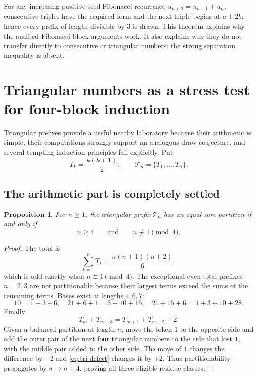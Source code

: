 \documentclass[11pt]{article}
\newtheorem{proposition}[theorem]{Proposition}
\theoremstyle{remark}
\begin{document}
For any increasing positive-seed Fibonacci recurrence
$u_{n+2}=u_{n+1}+u_n$, consecutive triples have the required form and the
next triple begins at $a+2b$; hence every prefix of length divisible by $3$
is drawn.  This theorem explains why the audited Fibonacci block arguments
work.  It also explains why they do not transfer directly to consecutive or
triangular numbers: the strong separation inequality is absent.

\section{Triangular numbers as a stress test for four-block induction}
Triangular prefixes provide a useful nearby laboratory because their
arithmetic is simple, their computations strongly support an analogous
draw conjecture, and several tempting induction principles fail explicitly.
Put
\[
T_k=\frac{k(k+1)}2,\qquad \mathcal T_n=\{T_1,\ldots,T_n\}.
\]

\subsection{The arithmetic part is completely settled}
\begin{proposition}\label{prop:tri-partition}
For $n\ge1$, the triangular prefix $\mathcal T_n$ has an equal-sum partition
if and only if
\[
n\ge4\qquad\text{and}\qquad n\not\equiv1\pmod4.
\]
\end{proposition}

\begin{proof}
The total is
\[
\sum_{k=1}^nT_k=\frac{n(n+1)(n+2)}6,
\]
which is odd exactly when $n\equiv1\pmod4$.  The exceptional even-total
prefixes $n=2,3$ are not partitionable because their largest terms exceed
the sums of the remaining terms.  Bases exist at lengths $4,6,7$:
\[
10=1+3+6,\quad
21+6+1=3+10+15,\quad
21+15+6=1+3+10+28.
\]
Finally
\begin{equation}\label{eq:tri-defect}
T_m+T_{m+3}=T_{m+1}+T_{m+2}+2.
\end{equation}
Given a balanced partition at length $n$, move the token $1$ to the opposite
side and add the outer pair of the next four triangular numbers to the side
that lost $1$, with the middle pair added to the other side.  The move of $1$
changes the difference by $-2$ and \eqref{eq:tri-defect} changes it by $+2$.
Thus partitionability propagates by $n\mapsto n+4$, proving all three
eligible residue classes.
\end{proof}
\end{document}
